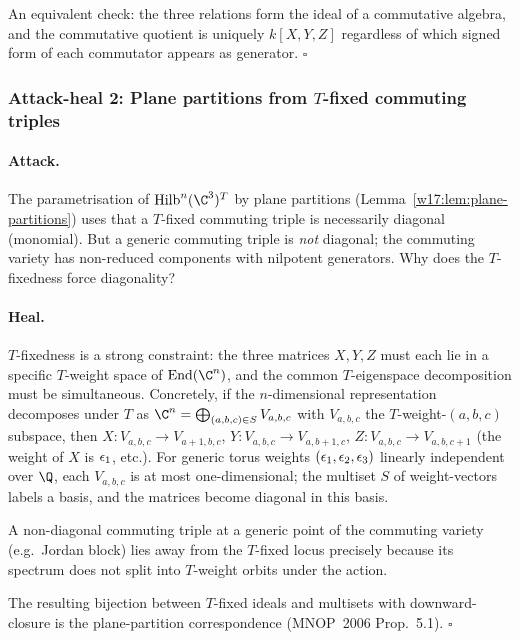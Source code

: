 An equivalent check: the three relations form the ideal of a commutative
algebra, and the commutative quotient is uniquely $k[X, Y, Z]$ regardless of
which signed form of each commutator appears as generator.
\hfill$\square$

\subsubsection{Attack-heal 2: Plane partitions from $T$-fixed commuting triples}
\label{w17:subsubsec:ah2-plane-partitions}

\paragraph{Attack.}
The parametrisation of $\Hilb^n(\C^3)^T$ by plane partitions
(Lemma~\ref{w17:lem:plane-partitions}) uses that a $T$-fixed commuting triple
is necessarily diagonal (monomial). But a generic commuting triple is
\emph{not} diagonal; the commuting variety has non-reduced components with
nilpotent generators. Why does the $T$-fixedness force diagonality?

\paragraph{Heal.}
$T$-fixedness is a strong constraint: the three matrices $X, Y, Z$ must each
lie in a specific $T$-weight space of $\mathrm{End}(\C^n)$, and the common
$T$-eigenspace decomposition must be simultaneous. Concretely, if the
$n$-dimensional representation decomposes under $T$ as
$\C^n = \bigoplus_{(a, b, c) \in S} V_{a, b, c}$ with $V_{a, b, c}$ the
$T$-weight-$(a, b, c)$ subspace, then $X: V_{a, b, c} \to V_{a+1, b, c}$,
$Y: V_{a, b, c} \to V_{a, b+1, c}$, $Z: V_{a, b, c} \to V_{a, b, c+1}$
(the weight of $X$ is $\epsilon_1$, etc.). For generic torus weights
$(\epsilon_1, \epsilon_2, \epsilon_3)$ linearly independent over $\Q$, each $V_{a, b, c}$ is
at most one-dimensional; the multiset $S$ of weight-vectors labels a basis, and
the matrices become diagonal in this basis.

A non-diagonal commuting triple at a generic point of the commuting variety
(e.g.\ Jordan block) lies away from the $T$-fixed locus precisely because its
spectrum does not split into $T$-weight orbits under the action.

The resulting bijection between $T$-fixed ideals and multisets with
downward-closure is the plane-partition correspondence (MNOP~2006 Prop.~5.1).
\hfill$\square$

